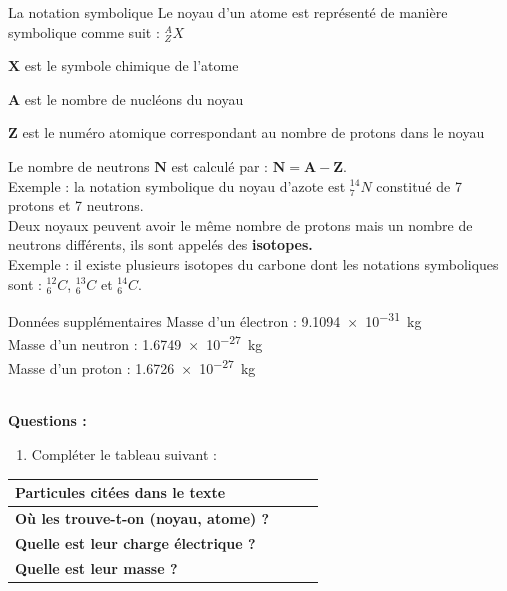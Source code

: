 \documentclass[a4paper,12pt,fleqn]{scrartcl}%
\begin{document}
\vspace{1em}
\noindent\begin{minipage}[t]{.55\linewidth}
	\begin{documentboxenv}{La notation symbolique}
	Le noyau d'un atome est représenté de manière symbolique comme suit : $^A_ZX$
	\begin{itemize*}
		\item $\mathbf{X}$ est le symbole chimique de l'atome
		\item $\mathbf{A}$ est le nombre de nucléons du noyau
		\item $\mathbf{Z}$ est le numéro atomique correspondant au nombre de protons dans le noyau
	\end{itemize*}
Le nombre de neutrons $\mathbf{N}$ est calculé par : $\mathbf{N = A - Z}$.\\
\textcolor{gray!80}{Exemple : la notation symbolique du noyau d'azote est $^{14}_7N$ constitué de 7 protons et 7 neutrons.}\\
Deux noyaux peuvent avoir le même nombre de protons mais un nombre de neutrons différents, ils sont appelés des \textbf{isotopes.}\\
\textcolor{gray!80}{Exemple : il existe plusieurs isotopes du carbone dont les notations symboliques sont : $^{12}_6C$, $^{13}_6C$ et $^{14}_6C$.}
\end{documentboxenv}\end{minipage}
\hspace{.02\linewidth}
\begin{minipage}[t]{.43\linewidth}
	\begin{documentboxenv}{Données supplémentaires }
	Masse d'un électron : \SI{9,1094e-31}{kg}\\
	Masse d'un neutron : \SI{1,6749e-27}{kg}\\
	Masse d'un proton : \SI{1,6726e-27}{kg}
	\end{documentboxenv}
\end{minipage}\\
\newpage
\textbf{Questions :}
\begin{enumerate}
	\item Compléter le tableau suivant :
\end{enumerate}
\begin{center}
	\begin{tabular}{|>{\centering}m{4cm}|m{4.5cm}|m{4.5cm}|m{4.5cm}|}
	\hline
	\textbf{Particules citées dans le texte}&&&\\
	\hline
	\textbf{Où les trouve-t-on (noyau, atome) ?}&&&\\
	\hline
	\textbf{Quelle est leur charge électrique ?}&&&\\
	\hline
	\textbf{Quelle est leur masse ?}&&&\\
	\hline 
\end{tabular}
\end{center}
\end{document}
